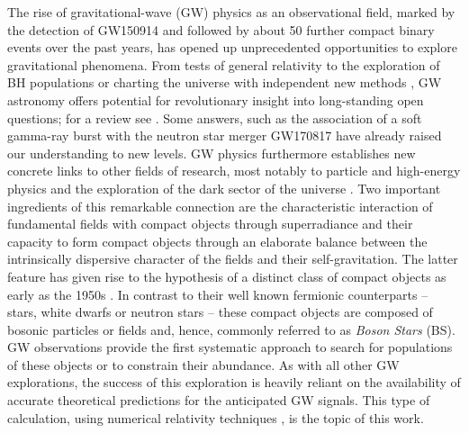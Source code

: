 The rise of gravitational-wave (GW) physics as an observational field,
marked by the detection of GW150914 \cite{Abbott:2016blz} and followed by about 50 further
compact binary events \cite{LIGOScientific:2018mvr,LIGOScientific:2020ibl}
over the past years, has opened
up unprecedented opportunities to explore gravitational phenomena.
From tests of general relativity
\cite{Berti:2015itd,TheLIGOScientific:2016src,Abbott:2018lct,LIGOScientific:2019fpa,LIGOScientific:2020tif,Moore:2021eok}
to the exploration
of BH populations \cite{Trifiro:2015zda,Belczynski:2017gds,LIGOScientific:2020kqk,Baibhav:2020xdf,Gerosa:2021mno}
or charting the universe with independent
new methods \cite{LIGOScientific:2017adf,LIGOScientific:2019zcs}, GW astronomy offers potential for
revolutionary insight into long-standing open questions;
for a review see \cite{Barack:2018yly}.
Some answers,
such as the association of a soft gamma-ray burst with the neutron star merger GW170817
\cite{TheLIGOScientific:2017qsa,Monitor:2017mdv} have already raised our understanding to new levels.
GW physics furthermore establishes new concrete links to other
fields of research, most notably to particle and high-energy
physics and the exploration of the dark sector of the universe
\cite{Cardoso:2014uka,Barack:2018yly}.
Two important ingredients of this remarkable connection are the
characteristic interaction of fundamental fields with compact
objects through superradiance \cite{Brito:2015oca} and their capacity
to form compact objects through an elaborate balance between
the intrinsically dispersive character of the fields and their
self-gravitation. The latter feature has given rise to the
hypothesis of a distinct class of compact objects as early as the
1950s \cite{Wheeler:1955zz}. In contrast to their well known fermionic counterparts --
stars, white dwarfs or neutron stars -- these compact objects are composed
of bosonic particles or fields and, hence, commonly referred to as
{\em Boson Stars} (BS). GW observations provide the first systematic
approach to search for populations of these objects or to constrain their
abundance. As with all other GW explorations, the success of
this exploration is heavily reliant on the availability of accurate
theoretical predictions for the anticipated GW signals.
This type of
calculation, using numerical relativity techniques
\cite{Baumgarte:2021skc}, is the topic of this work.

